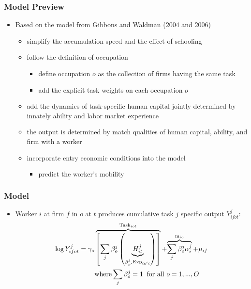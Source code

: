 \documentclass[10pt,svgnames,fragile]{beamer}
\begin{document}
{\begin{frame}
	\frametitle{Model Preview}
	\begin{itemize}
		\item Based on the model from  Gibbons and Waldman {\small (2004 and 2006)}
\vfill
		\begin{itemize}
			\item simplify the accumulation speed and the effect of schooling
\vfill
			\item follow the definition of occupation
			\begin{itemize}
				\vfill
				\item  define occupation $o$ as the collection of firms having the same task
				\vfill
				\item add the explicit task weights on each occupation $o$
			\end{itemize}
\vfill
\item add the dynamics of task-specific human capital jointly determined by innately ability and labor market experience 
\vfill
		\item the output is determined by match qualities of human capital, ability, and firm with a worker
		\vfill
	\item incorporate entry economic conditions into the model
		\begin{itemize}
			\vfill
			\item predict the worker's mobility
		\end{itemize}
		\vfill
		\end{itemize}
\end{itemize}
\end{frame}



\begin{frame}
	\frametitle{Model}
		\begin{itemize}
	\item Worker $i$ at firm $f$ in $o$ at $t$ produces cumulative task $j$ specific output $Y_{ifot}^j$:
	\begin{align}
		\log{Y_{ifot}^j} = \gamma_o&\overbrace{\left[  \sum_j \beta_{o}^j \left( \underbrace{H_{it}^{j}}_{\beta_{o'}^j \text{Exp}_{io't}}\right)  \right]}^{\text{Task}_{iot}} + {\overbrace{\sum_j \beta_{o}^j \alpha_{i}^j }^{\text{m}_{io}}+\mu_{if}}\\
		&\text{where} \sum_{j} \beta_{o}^j = 1 \;\;\text{for all }o=1,...,O \notag
	\end{align}


\end{itemize}
\end{frame}}
\end{document}
